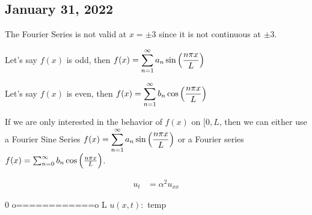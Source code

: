 \newpage
\subsection*{January 31, 2022}
The Fourier Series is not valid at $x = \pm 3$ since it is not continuous at $\pm 3$.

Let's say $f(x)$ is odd, then $\displaystyle f(x) = \sum^\infty_{n = 1} a_n \sin \Big( \frac{n \pi x}{L} \Big)$

Let's say $f(x)$ is even, then $\displaystyle f(x) = \sum^\infty_{n = 1} b_n \cos \Big( \frac{n \pi x}{L} \Big)$

If we are only interested in the behavior of $f(x)$ on $[0, L$, then we can either use a Fourier Sine Series $\displaystyle f(x) = \sum^\infty_{n = 1} a_n \sin \Big( \frac{n \pi x}{L} \Big)$ or a Fourier series $f(x) = \sum^\infty_{n = 0} b_n \cos \Big( \frac{n \pi x}{L} \Big)$.


\begin{align}
  u_t & = \alpha^2 u_{xx}
\end{align}
\begin{center}
  0 o============o L
  $u(x, t) : $ temp
\end{center}

